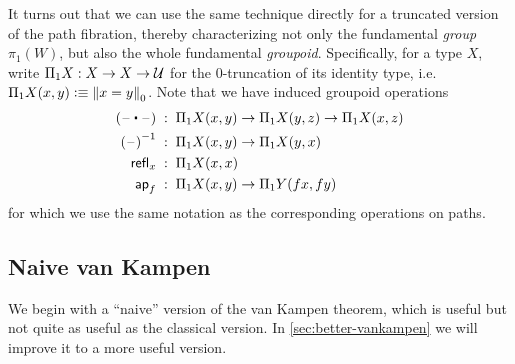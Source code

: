 It turns out that we can use the same technique directly for a truncated version of the path fibration, thereby characterizing not only the fundamental \emph{group} $\pi_1(W)$, but also the whole fundamental \emph{groupoid}.
%
Spe\-cif\-ical\-ly, for a type $X$, write $\Pi_1 X: X\to X\to \type$ for the $0$-truncation of its identity type, i.e.\ $\Pi_1 X(x,y) \defeq \trunc0{x=y}$.
Note that we have induced groupoid operations
\begin{align*}
  (\blank\ct\blank) &\;:\; \Pi_1X(x,y) \to \Pi_1X(y,z) \to \Pi_1X(x,z)\\
  \opp{(\blank)} &\;:\; \Pi_1X(x,y) \to \Pi_1X(y,x)\\
  \refl{x} &\;:\; \Pi_1X(x,x)\\
  \apfunc{f} &\;:\; \Pi_1X(x,y) \to \Pi_1Y(fx,fy)
\end{align*}
for which we use the same notation as the corresponding operations on paths.

\subsection{Naive van Kampen}
\label{sec:naive-vankampen}

We begin with a ``naive'' version of the van Kampen theorem, which is useful but not quite as useful as the classical version.
In \cref{sec:better-vankampen} we will improve it to a more useful version.

%


